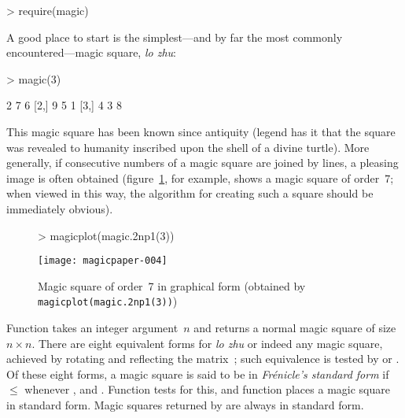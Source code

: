 \documentclass[nojss]{jss}
\begin{document}
\begin{Schunk}
\begin{Sinput}
> require(magic)
\end{Sinput}
\end{Schunk}

A good place to start is the simplest---and by far the most commonly
encountered---magic square, {\em lo zhu}:

\begin{Schunk}
\begin{Sinput}
> magic(3)
\end{Sinput}
\begin{Soutput}
     [,1] [,2] [,3]
[1,]    2    7    6
[2,]    9    5    1
[3,]    4    3    8
\end{Soutput}
\end{Schunk}

This magic square has been known since antiquity (legend has it that
the square was revealed to humanity inscribed upon the shell of a
divine turtle).  More generally, if consecutive numbers of a magic
square are joined by lines, a pleasing image is often obtained
(figure~\ref{magic7}, for example, shows a magic square of order~7;
when viewed in this way, the algorithm for creating such a square
should be immediately obvious).

\begin{figure}[htbp]
  \begin{center}
\begin{Schunk}
\begin{Sinput}
> magicplot(magic.2np1(3))
\end{Sinput}
\end{Schunk}
\texttt{[image: magicpaper-004]}
    \caption{Magic square of order~7\label{magic7} in graphical form
(obtained by \texttt{magicplot(magic.2np1(3))}) }
  \end{center}
\end{figure}

Function  takes an integer argument~$n$ and returns a
normal magic square of size $n\times n$.  There are eight equivalent
forms for {\em lo zhu\/} or indeed any magic square, achieved by
rotating and reflecting the matrix~\citep{benson1976}; such equivalence
is tested by  or .  Of these eight forms, a
magic square  is said to be in {\em Fr\'{e}nicle's standard
form} if $\leq$ whenever ,
and .  Function  tests for
this, and function  places a magic square in
standard form.  Magic squares returned by  are always in
standard form.
\end{document}
